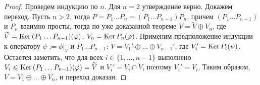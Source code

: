 \begin{proof}
	Проведем индукцию по $n$. Для $n = 2$ утверждение верно. Докажем переход. Пусть $n > 2$, тогда $P = P_1\dots P_n = (P_1\dots P_{n - 1})P_n$, причем $(P_1\dots P_{n-1})$ и $P_n$ взаимно просты, тогда по уже доказанной теореме $V = \widetilde{V} \oplus V_n$, где $\widetilde{V} = \operatorname{Ker}{(P_1\dots P_{n-1})(\varphi)}$, $V_n = \operatorname{Ker}{P_n(\varphi)}$. Применим предположение индукции к оператору $\psi := \phi|_{\widetilde{V}}$ и $P_1\dots P_{n-1}$: $\widetilde{V} = V_1' \oplus \dots \oplus V_{n-1}'$, где $V_i' = \operatorname{Ker}{P_i(\psi)}$. Остается заметить, что для всех $i \in \{1, \dotsc, n - 1\}$ выполнено $V_i \hm{\le} \ke{(P_1\dots P_{n-1})(\phi)} \hm{=} \widetilde{V}$ и $V_i' = V_i \cap \widetilde{V}$, поэтому $V_i' = V_i$, Таким образом, $V = V_1 \oplus \dots \oplus V_n$, и переход доказан.
\end{proof}